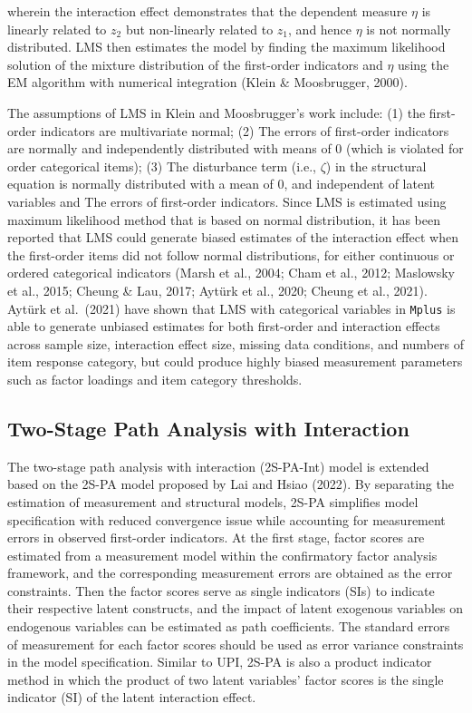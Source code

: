 \documentclass[
  man]{apa7}
\begin{document}
wherein the interaction effect demonstrates that the dependent measure \(\eta\) is linearly related to \(z_{2}\) but non-linearly related to \(z_{1}\), and hence \(\eta\) is not normally distributed. LMS then estimates the model by finding the maximum likelihood solution of the mixture distribution of the first-order indicators and \(\eta\) using the EM algorithm with numerical integration (Klein \& Moosbrugger, 2000).

The assumptions of LMS in Klein and Moosbrugger's work include: (1) the first-order indicators are multivariate normal; (2) The errors of first-order indicators are normally and independently distributed with means of 0 (which is violated for order categorical items); (3) The disturbance term (i.e., \(\zeta\)) in the structural equation is normally distributed with a mean of 0, and independent of latent variables and The errors of first-order indicators. Since LMS is estimated using maximum likelihood method that is based on normal distribution, it has been reported that LMS could generate biased estimates of the interaction effect when the first-order items did not follow normal distributions, for either continuous or ordered categorical indicators (Marsh et al., 2004; Cham et al., 2012; Maslowsky et al., 2015; Cheung \& Lau, 2017; Aytürk et al., 2020; Cheung et al., 2021). Aytürk et al.~(2021) have shown that LMS with categorical variables in \texttt{Mplus} is able to generate unbiased estimates for both first-order and interaction effects across sample size, interaction effect size, missing data conditions, and numbers of item response category, but could produce highly biased measurement parameters such as factor loadings and item category thresholds.

\hypertarget{two-stage-path-analysis-with-interaction}{%
\subsection{Two-Stage Path Analysis with Interaction}\label{two-stage-path-analysis-with-interaction}}

The two-stage path analysis with interaction (2S-PA-Int) model is extended based on the 2S-PA model proposed by Lai and Hsiao (2022). By separating the estimation of measurement and structural models, 2S-PA simplifies model specification with reduced convergence issue while accounting for measurement errors in observed first-order indicators. At the first stage, factor scores are estimated from a measurement model within the confirmatory factor analysis framework, and the corresponding measurement errors are obtained as the error constraints. Then the factor scores serve as single indicators (SIs) to indicate their respective latent constructs, and the impact of latent exogenous variables on endogenous variables can be estimated as path coefficients. The standard errors of measurement for each factor scores should be used as error variance constraints in the model specification. Similar to UPI, 2S-PA is also a product indicator method in which the product of two latent variables' factor scores is the single indicator (SI) of the latent interaction effect.
\end{document}
